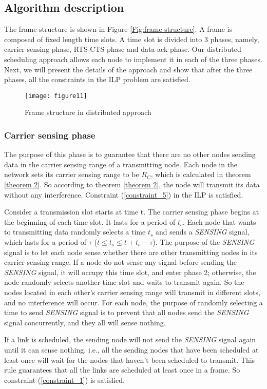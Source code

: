 \documentclass[conference]{IEEEtran}
\begin{document}
\subsection{Algorithm description}
The frame structure is shown in Figure \ref{Fig:frame structure}. A
frame is composed of fixed length time slots. A time slot is divided
into 3 phases, namely, carrier sensing phase, RTS-CTS phase and
data-ack phase. Our distributed scheduling approach allows each node
to implement it in each of the three phases. Next, we will present
the details of the approach and show that after the three phases,
all the constraints in the ILP problem are satisfied.
\begin{figure}[!h]
\centering
\texttt{[image: figure11]}
\caption{Frame structure in distributed approach} \label{Fig:frame
structure}
\end{figure}
\subsubsection{Carrier sensing phase}
The purpose of this phase is to guarantee that there are no other
nodes sending data in the carrier sensing range of a transmitting
node. Each node in the network sets its carrier sensing range to be
$R_C$, which is calculated in theorem \ref{theorem 2}. So according
to theorem \ref{theorem 2}, the node will transmit its data without
any interference. Constraint (\ref{constraint_5}) in the ILP is
satisfied.

Consider a transmission slot starts at time t. The carrier sensing
phase begins at the beginning of each time slot. It lasts for a
period of $t_c$. Each node that wants to transmitting data randomly
selects a time $t_s$ and sends a \emph{SENSING} signal, which lasts
for a period of $\tau$ ($t\leq t_s \leq t+t_c-\tau$). The purpose of
the \emph{SENSING} signal is to let each node sense whether there
are other transmitting nodes in its carrier sensing range. If a node
do not sense any signal before sending the \emph{SENSING} signal, it
will occupy this time slot, and enter phase 2; otherwise, the node
randomly selects another time slot and waits to transmit again. So
the nodes located in each other's carrier sensing range will
transmit in different slots, and no interference will occur. For
each node, the purpose of randomly selecting a time to send
\emph{SENSING} signal is to prevent that all nodes send the
\emph{SENSING} signal concurrently, and they all will sense nothing.

If a link is scheduled, the sending node will not send the
\emph{SENSING} signal again until it can sense nothing, i.e., all
the sending nodes that have been scheduled at least once will wait
for the nodes that haven't been scheduled to transmit. This rule
guarantees that all the links are scheduled at least once in a
frame. So constraint (\ref{constraint_1}) is satisfied.
\end{document}
